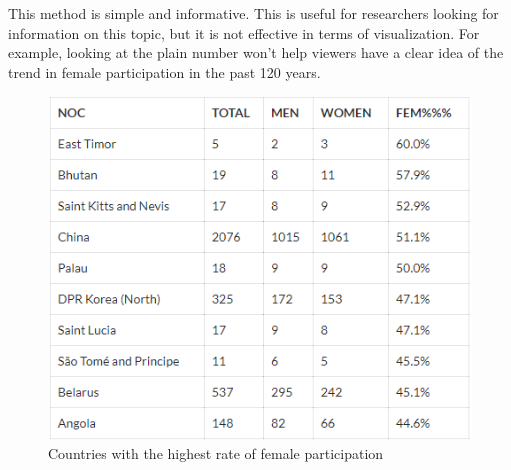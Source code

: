 \documentclass[12pt]{article}
\begin{document}
This method is simple and informative. This is useful for researchers looking for information on this topic, but it is not effective in terms of visualization. For example, looking at the plain number won’t help viewers have a clear idea of the trend in female participation in the past 120 years. 

\begin{table}[!hb]  
  \centering
  \begin{subfigure}[t]{2.5in}
    \centering
    \includegraphics[scale=0.3]{pics/1-1.png}
    \caption{Countries with the highest rate of female participation}\label{fig:1a}
  \end{subfigure}
  \quad
  \begin{subfigure}[t]{2.5in}
    \centering

\end{subfigure}
\end{table}
\end{document}
